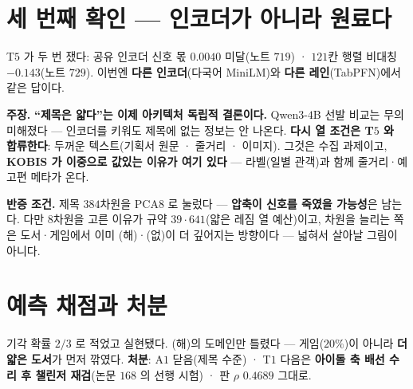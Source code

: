 \documentclass[10pt,a4paper]{article}
\newcommand{\claim}[2]{\begin{claimbox}\textbf{주장.} #1\par\smallskip
  \textcolor{gray!70}{\textbf{반증 조건.} #2}\end{claimbox}}
\begin{document}
\section{세 번째 확인 --- 인코더가 아니라 원료다}

T$5$ 가 두 번 쟀다: 공유 인코더 신호 몫 $0.0040$ 미달(노트 $719$) · $121$칸 행렬
비대칭 $-0.143$(노트 $729$). 이번엔 \textbf{다른 인코더}(다국어 MiniLM)와
\textbf{다른 레인}(TabPFN)에서 같은 답이다.

\claim{\textbf{``제목은 얇다''는 이제 아키텍처 독립적 결론이다.} Qwen$3$-$4$B
선발 비교는 무의미해졌다 --- 인코더를 키워도 제목에 없는 정보는 안 나온다.
\textbf{다시 열 조건은 T$5$ 와 합류한다}: 두꺼운 텍스트(기획서 원문 · 줄거리 ·
이미지). 그것은 수집 과제이고, \textbf{KOBIS 가 이중으로 값있는 이유가 여기
있다} --- 라벨(일별 관객)과 함께 줄거리·예고편 메타가 온다.}
{제목 $384$차원을 PCA$8$ 로 눌렀다 --- \textbf{압축이 신호를 죽였을 가능성}은
남는다. 다만 $8$차원을 고른 이유가 규약 $39 \cdot 641$(얇은 레짐 열 예산)이고,
차원을 늘리는 쪽은 도서·게임에서 이미 (해)·(없)이 더 깊어지는 방향이다 ---
넓혀서 살아날 그림이 아니다.}

\section{예측 채점과 처분}

기각 확률 $2/3$ 로 적었고 실현됐다. (해)의 도메인만 틀렸다 --- 게임($20\%$)이
아니라 \textbf{더 얇은 도서}가 먼저 깎였다. \textbf{처분}: A$1$ 닫음(제목 수준) ·
T$1$ 다음은 \textbf{아이돌 축 배선 수리 후 챌린저 재검}(논문 $168$ 의 선행 시험) ·
판 $\rho$ $0.4689$ 그대로.
\end{document}

